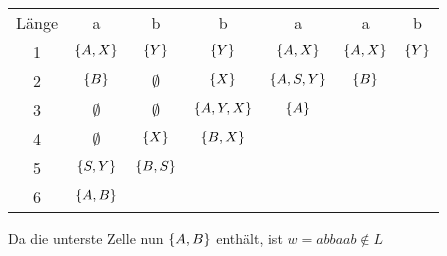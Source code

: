 \renewcommand{\arraystretch}{1.2}
\begin{tabular}{ccccccc}
	Länge & a & b & b & a & a & b\\
	\cline{2-7}
	1 & \multicolumn{1}{|c|}{$\left\{ A,X \right\}$} & \multicolumn{1}{c|}{$\left\{ Y \right\}$} & \multicolumn{1}{c|}{$\left\{ Y \right\}$} & \multicolumn{1}{c|}{$\left\{ A,X \right\}$} & \multicolumn{1}{c|}{$\left\{ A,X \right\}$} & \multicolumn{1}{c|}{$\left\{ Y \right\}$}\\
	\cline{2-7}
	2 & \multicolumn{1}{|c|}{$\left\{ B \right\}$} & \multicolumn{1}{c|}{$\emptyset$} & \multicolumn{1}{c|}{$\left\{ X \right\}$} & \multicolumn{1}{c|}{$\left\{ A,S,Y \right\}$} & \multicolumn{1}{c|}{$\left\{ B \right\}$} &\\
	\cline{2-6}
	3 & \multicolumn{1}{|c|}{$\emptyset$} & \multicolumn{1}{c|}{$\emptyset$} & \multicolumn{1}{c|}{$\left\{ A,Y,X \right\}$} & \multicolumn{1}{c|}{$\left\{ A \right\}$} &&\\
	\cline{2-5}
	4 & \multicolumn{1}{|c|}{$\emptyset$} & \multicolumn{1}{c|}{$\left\{ X \right\}$} & \multicolumn{1}{c|}{$\left\{ B,X \right\}$} &&&\\
	\cline{2-4}
	5 & \multicolumn{1}{|c|}{$\left\{ S,Y \right\}$} & \multicolumn{1}{c|}{$\left\{ B,S \right\}$} &&&&\\
	\cline{2-3}
	6 & \multicolumn{1}{|c|}{$\left\{ A,B \right\}$} &&&&&\\
	\cline{2-2}
\end{tabular}

Da die unterste Zelle nun $\left\{ A,B \right\}$ enthält, ist $w=abbaab\not\in L$



